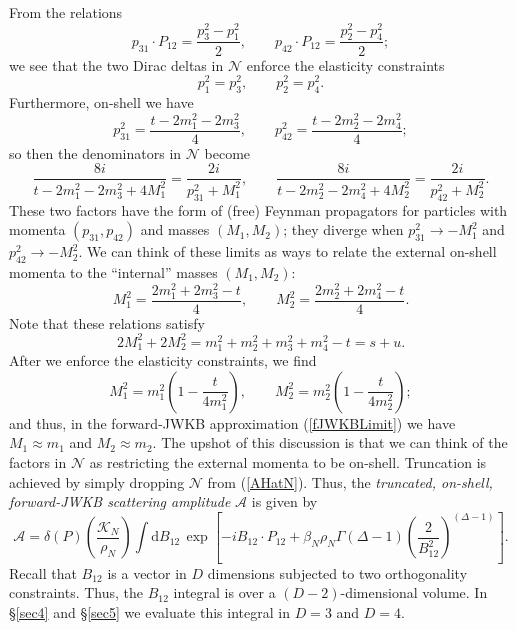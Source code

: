 From the relations
\begin{equation}
	p_{31} \cdot P_{12} = \frac{p_{3}^{2} - p_{1}^{2}}{2}, \qquad p_{42} \cdot P_{12} = \frac{p_{2}^{2} - p_{4}^{2}}{2};
\end{equation}
we see that the two Dirac deltas in $\mathcal{N}$ enforce the elasticity constraints
\begin{equation}
	p_{1}^{2} = p_{3}^{2}, \qquad p_{2}^{2} = p_{4}^{2}.
\end{equation}
Furthermore, on-shell we have
\begin{equation}
	p_{31}^{2} = \frac{t - 2 m_{1}^{2} - 2m_{3}^{2}}{4}, \qquad p_{42}^{2} = \frac{t - 2 m_{2}^{2} - 2m_{4}^{2}}{4};
\end{equation}
so then the denominators in $\mathcal{N}$ become
\begin{equation}
	\frac{8i}{t - 2m_{1}^{2} - 2m_{3}^{2} + 4 M_{1}^{2}} = \frac{2i}{p_{31}^{2} + M_{1}^{2}}, \qquad \frac{8i}{t - 2m_{2}^{2} - 2m_{4}^{2} + 4 M_{2}^{2}} = \frac{2i}{p_{42}^{2} + M_{2}^{2}}.
\end{equation}
These two factors have the form of (free) Feynman propagators for particles with momenta $(p_{31}, p_{42})$ and masses $(M_{1}, M_{2})$; they diverge when $p_{31}^{2} \rightarrow -M_{1}^{2}$ and $p_{42}^{2} \rightarrow -M_{2}^{2}$. We can think of these limits as ways to relate the external on-shell momenta to the ``internal'' masses $(M_{1}, M_{2})$:
\begin{equation}
	M_{1}^{2} = \frac{2m_{1}^{2} + 2m_{3}^{2} - t}{4}, \qquad M_{2}^{2} = \frac{2m_{2}^{2} + 2m_{4}^{2} - t}{4}.
\end{equation}
Note that these relations satisfy
\begin{equation}
	2M_{1}^{2} + 2M_{2}^{2} = m_{1}^{2} + m_{2}^{2} + m_{3}^{2} + m_{4}^{2} - t = s + u.
\end{equation}
After we enforce the elasticity constraints, we find
\begin{equation}
	M_{1}^{2} = m_{1}^{2} \left( 1 - \frac{t}{4 m_{1}^{2}} \right), \qquad M_{2}^{2} = m_{2}^{2} \left( 1 - \frac{t}{4 m_{2}^{2}} \right);
\end{equation}
and thus, in the forward-JWKB approximation (\ref{fJWKBLimit}) we have $M_{1} \approx m_{1}$ and $M_{2} \approx m_{2}$. The upshot of this discussion is that we can think of the factors in $\mathcal{N}$ as restricting the external momenta to be on-shell. Truncation is achieved by simply dropping $\mathcal{N}$ from (\ref{AHatN}). Thus, the \textit{truncated, on-shell, forward-JWKB scattering amplitude} $\mathcal{A}$ is given by
\begin{equation}
	\mathcal{A} = \delta(P) \left( \frac{\mathcal{K}_{N}}{\rho_{N}} \right) \int \mathrm{d}B_{12} \, \exp{\left[-i B_{12} \cdot P_{12} + \beta_{N} \rho_{N} \Gamma(\Delta - 1) \left( \frac{2}{B_{1 2}^{2}} \right)^{(\Delta - 1)} \right]}.
	\label{AHND}
\end{equation}
Recall that $B_{12}$ is a vector in $D$ dimensions subjected to two orthogonality constraints. Thus, the $B_{12}$ integral is over a $(D-2)$-dimensional volume. In \S\ref{sec4} and \S\ref{sec5} we evaluate this integral in $D = 3$ and $D = 4$.